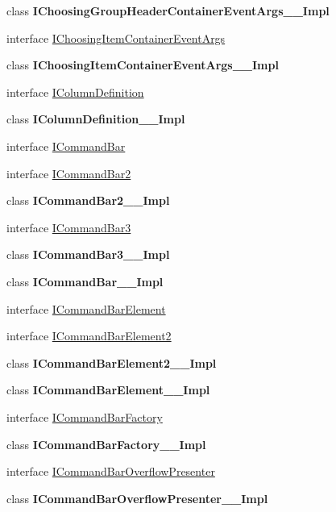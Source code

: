 \begin{DoxyCompactItemize}
\item 
class {\bfseries I\+Choosing\+Group\+Header\+Container\+Event\+Args\+\_\+\+\_\+\+Impl}
\item 
interface \hyperlink{interface_windows_1_1_u_i_1_1_xaml_1_1_controls_1_1_i_choosing_item_container_event_args}{I\+Choosing\+Item\+Container\+Event\+Args}
\item 
class {\bfseries I\+Choosing\+Item\+Container\+Event\+Args\+\_\+\+\_\+\+Impl}
\item 
interface \hyperlink{interface_windows_1_1_u_i_1_1_xaml_1_1_controls_1_1_i_column_definition}{I\+Column\+Definition}
\item 
class {\bfseries I\+Column\+Definition\+\_\+\+\_\+\+Impl}
\item 
interface \hyperlink{interface_windows_1_1_u_i_1_1_xaml_1_1_controls_1_1_i_command_bar}{I\+Command\+Bar}
\item 
interface \hyperlink{interface_windows_1_1_u_i_1_1_xaml_1_1_controls_1_1_i_command_bar2}{I\+Command\+Bar2}
\item 
class {\bfseries I\+Command\+Bar2\+\_\+\+\_\+\+Impl}
\item 
interface \hyperlink{interface_windows_1_1_u_i_1_1_xaml_1_1_controls_1_1_i_command_bar3}{I\+Command\+Bar3}
\item 
class {\bfseries I\+Command\+Bar3\+\_\+\+\_\+\+Impl}
\item 
class {\bfseries I\+Command\+Bar\+\_\+\+\_\+\+Impl}
\item 
interface \hyperlink{interface_windows_1_1_u_i_1_1_xaml_1_1_controls_1_1_i_command_bar_element}{I\+Command\+Bar\+Element}
\item 
interface \hyperlink{interface_windows_1_1_u_i_1_1_xaml_1_1_controls_1_1_i_command_bar_element2}{I\+Command\+Bar\+Element2}
\item 
class {\bfseries I\+Command\+Bar\+Element2\+\_\+\+\_\+\+Impl}
\item 
class {\bfseries I\+Command\+Bar\+Element\+\_\+\+\_\+\+Impl}
\item 
interface \hyperlink{interface_windows_1_1_u_i_1_1_xaml_1_1_controls_1_1_i_command_bar_factory}{I\+Command\+Bar\+Factory}
\item 
class {\bfseries I\+Command\+Bar\+Factory\+\_\+\+\_\+\+Impl}
\item 
interface \hyperlink{interface_windows_1_1_u_i_1_1_xaml_1_1_controls_1_1_i_command_bar_overflow_presenter}{I\+Command\+Bar\+Overflow\+Presenter}
\item 
class {\bfseries I\+Command\+Bar\+Overflow\+Presenter\+\_\+\+\_\+\+Impl}

\end{DoxyCompactItemize}
